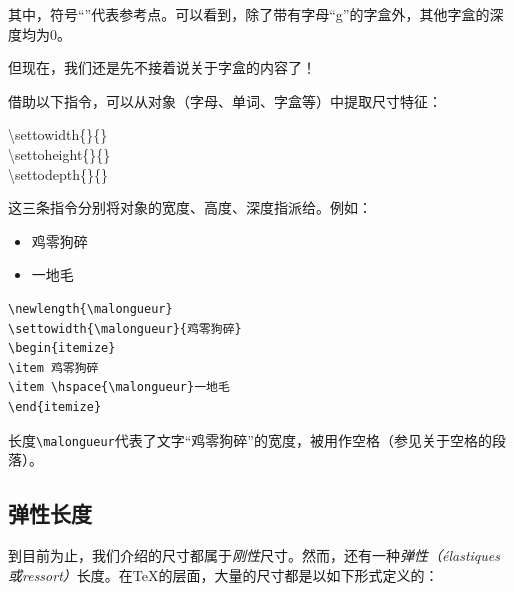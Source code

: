 \begin{center}
\end{center}

其中，符号“”代表参考点。可以看到，除了带有字母“g”的字盒外，其他字盒的深度均为0。

但现在，我们还是先不接着说关于字盒的内容了！

借助以下指令，可以从对象（字母、单词、字盒等）中提取尺寸特征：

\begin{dmd}
\backslash settowidth\{\}\{\}\\
\backslash settoheight\{\}\{\}\\
\backslash settodepth\{\}\{\}
\end{dmd}

这三条指令分别将对象的宽度、高度、深度指派给。例如：

\begin{codelist}[4.1]{
\newlength{\malongueur}
\settowidth{\malongueur}{鸡零狗碎}
\begin{itemize}
\item 鸡零狗碎
\item \hspace{\malongueur}一地毛
\end{itemize}
}
\begin{verbatim}
\newlength{\malongueur}
\settowidth{\malongueur}{鸡零狗碎}
\begin{itemize}
\item 鸡零狗碎
\item \hspace{\malongueur}一地毛
\end{itemize}\end{verbatim}
\end{codelist}

长度\verb|\malongueur|代表了文字“鸡零狗碎”的宽度，被用作空格（参见关于空格的段落）。

\subsection{弹性长度}

到目前为止，我们介绍的尺寸都属于\emph{刚性}尺寸。然而，还有一种\emph{弹性（élastiques或ressort）}长度。在\TeX 的层面，大量的尺寸都是以如下形式定义的：


